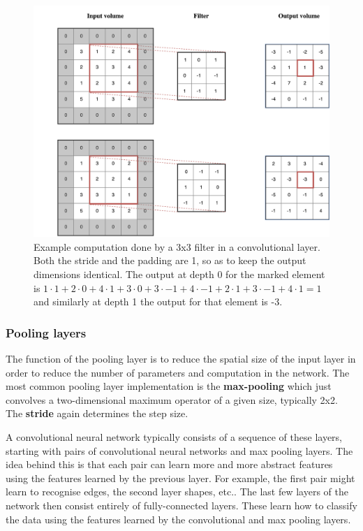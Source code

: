 \documentclass[12pt,a4paper,twoside,openright]{report}
\begin{document}
\begin{figure}[h]
	\centering
	\includegraphics[scale=0.6]{conv_example}
	\caption[Example computation done by a 3x3 filter in a convolutional layer]{Example computation done by a 3x3 filter in a convolutional layer. Both the stride and the padding are 1, so as to keep the output dimensions identical. The output at depth 0 for the marked element is $1 \cdot 1 + 2 \cdot 0 + 4 \cdot 1 + 3 \cdot 0 + 3 \cdot -1 + 4 \cdot -1 + 2 \cdot 1 + 3 \cdot -1 + 4 \cdot 1 = 1$ and similarly at depth 1 the output for that element is -3.}
	\label{fig:conv_example}
\end{figure}

\subsubsection{Pooling layers}
The function of the pooling layer is to reduce the spatial size of the input layer in order to reduce the number of parameters and computation in the network. The most common pooling layer implementation is the \textbf{max-pooling} which just convolves a two-dimensional maximum operator of a given size, typically 2x2. The \textbf{stride} again determines the step size.
\newline

A convolutional neural network typically consists of a sequence of these layers, starting with pairs of convolutional neural networks and max pooling layers. The idea behind this is that each pair can learn more and more abstract features using the features learned by the previous layer. For example, the first pair might learn to recognise edges, the second layer shapes, etc.. The last few layers of the network then consist entirely of fully-connected layers. These learn how to classify the data using the features learned by the convolutional and max pooling layers.
\end{document}

